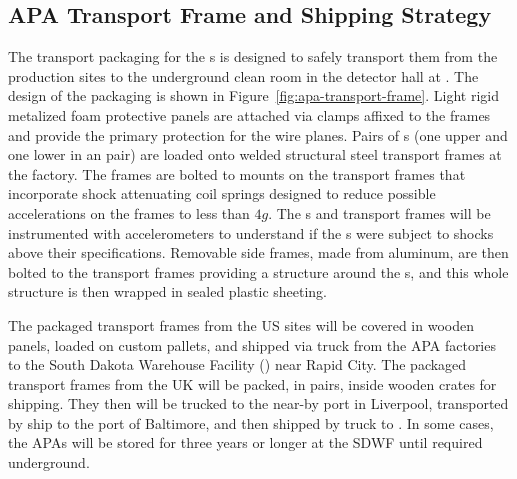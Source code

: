 \subsection{APA Transport Frame and Shipping Strategy}
\label{sec:fdsp-apa-transport-container}


The transport packaging for the s is designed to safely transport them from the production sites to the underground clean room in the detector hall at . 
The design of the packaging is shown in Figure~\ref{fig:apa-transport-frame}. Light rigid metalized foam protective panels are attached via clamps affixed to the  frames and provide the primary protection for the wire planes. Pairs of s (one upper and one lower in an  pair) are loaded onto welded structural steel transport frames at the factory. The  frames are bolted to mounts on the transport frames that incorporate shock attenuating coil springs designed to reduce possible accelerations on the  frames to less than $4g$. The s and transport frames will be instrumented with accelerometers to understand if the s were subject to shocks above their specifications. Removable side frames, made from aluminum, are then bolted to the transport frames providing a structure around the s, and this whole structure is then wrapped in sealed plastic sheeting. 

The packaged transport frames from the US sites will be covered in wooden panels, loaded on custom pallets, and shipped via truck from the APA factories to the South Dakota Warehouse Facility () near Rapid City. The packaged transport frames from the UK will be packed, in pairs, inside wooden crates for shipping. They then will be trucked to the near-by port in Liverpool, transported by ship to the port of Baltimore, and then shipped by truck to . In some cases, the APAs will be stored for three years or longer at the SDWF until required underground. 

